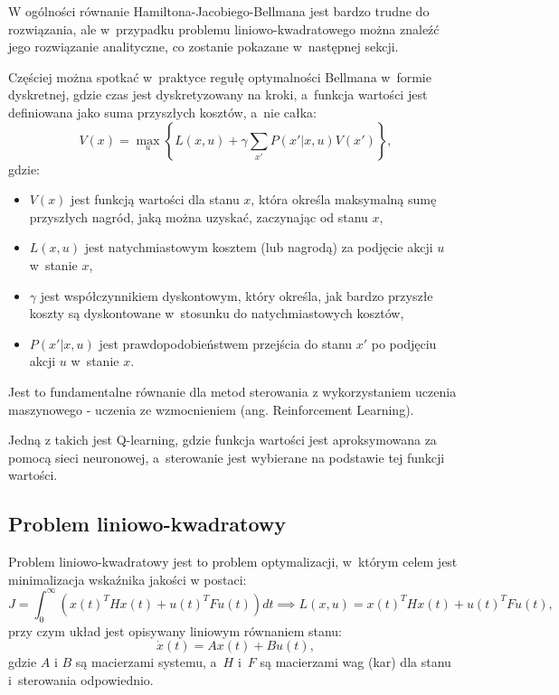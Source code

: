 \documentclass{article}
\begin{document}
    W ogólności równanie Hamiltona-Jacobiego-Bellmana jest bardzo
    trudne do rozwiązania, ale w~przypadku problemu liniowo-kwadratowego
    można znaleźć jego rozwiązanie analityczne, co zostanie pokazane
    w~następnej sekcji.

    \begin{tcolorbox}[colback=orange!5, colframe=orange!75!black, title=Uwaga]
        Częściej można spotkać w~praktyce regułę optymalności Bellmana w~formie
        dyskretnej, gdzie czas jest dyskretyzowany na kroki, a~funkcja wartości
        jest definiowana jako suma przyszłych kosztów, a~nie całka:
        \[
            V(x) = \max_{u} \left\{ L(x,u) + \gamma \sum_{x'}P(x'|x,u)V(x') \right\},
        \]
        gdzie:
        \begin{itemize}
            \item $V(x)$ jest funkcją wartości dla stanu $x$, która określa maksymalną sumę przyszłych nagród, jaką można uzyskać, zaczynając od stanu $x$,
            \item $L(x,u)$ jest natychmiastowym kosztem (lub nagrodą) za podjęcie akcji $u$ w~stanie $x$,
            \item $\gamma$ jest współczynnikiem dyskontowym, który określa, jak bardzo przyszłe koszty są dyskontowane w~stosunku do natychmiastowych kosztów,
            \item $P(x'|x,u)$ jest prawdopodobieństwem przejścia do stanu $x'$ po podjęciu akcji $u$ w~stanie $x$.
        \end{itemize}
        
        Jest to fundamentalne równanie dla metod sterowania z wykorzystaniem
        uczenia maszynowego - uczenia ze wzmocnieniem (ang. Reinforcement
        Learning).
        
        Jedną z takich jest Q-learning, gdzie funkcja wartości jest
        aproksymowana za pomocą sieci neuronowej, a~sterowanie jest wybierane na
        podstawie tej funkcji wartości.
    \end{tcolorbox} 

    \subsection{Problem liniowo-kwadratowy}
    Problem liniowo-kwadratowy jest to problem optymalizacji,
    w~którym celem jest minimalizacja wskaźnika jakości w postaci:
    \[
        J = \int_{0}^{\infty}{\left( x(t)^{T}Hx(t) + u(t)^{T}Fu(t) \right)dt} \implies L(x,u) = x(t)^{T}Hx(t) + u(t)^{T}Fu(t),
    \]
    przy czym układ jest opisywany liniowym równaniem stanu:
    \[
        \dot{x}(t) = Ax(t) + Bu(t),
    \]
    gdzie $A$ i $B$ są macierzami systemu, a~$H$ i~$F$ są
    macierzami wag (kar) dla stanu i~sterowania odpowiednio.
\end{document}
